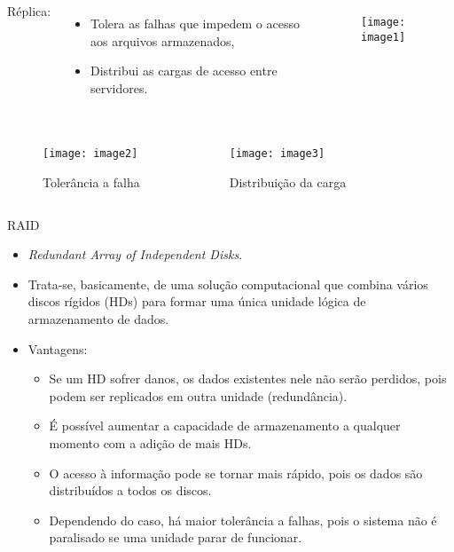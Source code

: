 \begin{frame}{}
	\begin{columns}
		Réplica:
		\begin{itemize}
			\item Tolera as falhas que impedem o acesso aos arquivos armazenados,
			\item Distribui as cargas de acesso entre servidores.
		\end{itemize}
		
		\begin{figure}
			\texttt{[image: image1]}
			\label{fig:exemplo}
		\end{figure}
		
		
	\end{columns}
\end{frame}

\begin{frame}{}
	\begin{columns}
		\column{0.45\textwidth}
		
		\begin{figure}
			\texttt{[image: image2]}
			\caption{Tolerância a falha}
			\label{fig:exemplo}
		\end{figure}
		
		\column{0.1\textwidth}
		
		\column{0.45\textwidth}
		
		\begin{figure}
			\texttt{[image: image3]}
			\caption{Distribuição da carga}
			\label{fig:exemplo}
		\end{figure}
		
		
	\end{columns}
\end{frame}
\begin{frame}{RAID}
	
	\begin{itemize}
		\item \textit{Redundant Array of Independent Disks}.
		\item Trata-se, basicamente, de uma solução computacional que combina vários discos rígidos (HDs) para formar uma única unidade lógica de armazenamento de dados.
		\item Vantagens:
		\begin{itemize}
			\item Se um HD sofrer danos, os dados existentes nele não serão perdidos, pois podem ser replicados em outra unidade (redundância).
			\item É possível aumentar a capacidade de armazenamento a qualquer momento com a adição de mais HDs.
			\item O acesso à informação pode se tornar mais rápido, pois os dados são distribuídos a todos os discos.
			\item Dependendo do caso, há maior tolerância a falhas, pois o sistema não é paralisado se uma unidade parar de funcionar.
		\end{itemize}
	\end{itemize}
\end{frame}

